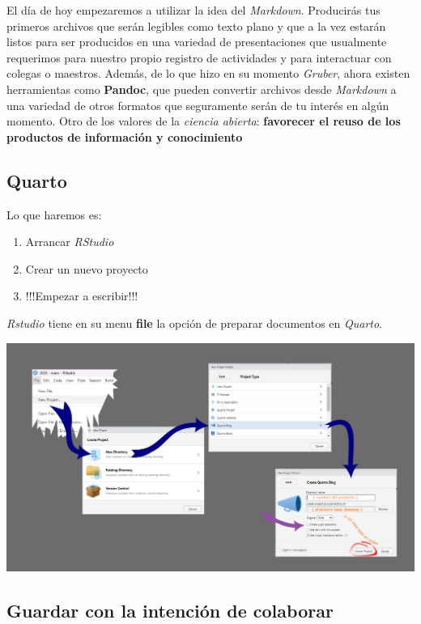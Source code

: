 \documentclass[
  letterpaper,
  DIV=11,
  numbers=noendperiod]{scrartcl}
\providecommand{\tightlist}{%
  \setlength{\itemsep}{0pt}\setlength{\parskip}{0pt}}\usepackage{longtable,booktabs,array}
\begin{document}
El día de hoy empezaremos a utilizar la idea del \emph{Markdown}.
Producirás tus primeros archivos que serán legibles como texto plano y
que a la vez estarán listos para ser producidos en una variedad de
presentaciones que usualmente requerimos para nuestro propio registro de
actividades y para interactuar con colegas o maestros. Además, de lo que
hizo en su momento \emph{Gruber}, ahora existen herramientas como
\textbf{Pandoc}, que pueden convertir archivos desde \emph{Markdown} a
una variedad de otros formatos que seguramente serán de tu interés en
algún momento. Otro de los valores de la \emph{ciencia abierta}:
\textbf{favorecer el reuso de los productos de información y
conocimiento}

\subsection{Quarto}\label{quarto}

Lo que haremos es:

\begin{enumerate}
\def\labelenumi{\arabic{enumi}.}
\tightlist
\item
  Arrancar \emph{RStudio}
\item
  Crear un nuevo proyecto
\item
  {!!!Empezar a escribir!!!}
\end{enumerate}

\emph{Rstudio} tiene en su menu \textbf{file} la opción de preparar
documentos en \emph{Quarto}.

\includegraphics{images/proyecto-blog.png}

\subsection{Guardar con la intención de
colaborar}\label{guardar-con-la-intenciuxf3n-de-colaborar}
\end{document}
